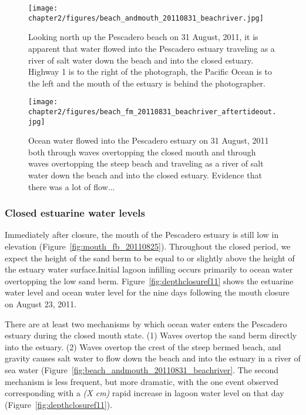 \begin{figure}
	\begin{center}
		\texttt{[image: chapter2/figures/beach\_andmouth\_20110831\_beachriver.jpg]} \caption{Looking north up the Pescadero beach on 31 August, 2011, it is apparent that water flowed into the Pescadero estuary traveling as a river of salt water down the beach and into the closed estuary. Highway 1 is to the right of the photograph, the Pacific Ocean is to the left and the mouth of the estuary is behind the photographer.}
	\end{center}
\label{fig:beachriver} \end{figure}

\begin{figure}
	\begin{center}
		\texttt{[image: chapter2/figures/beach\_fm\_20110831\_beachriver\_aftertideout.jpg]} \caption{Ocean water flowed into the Pescadero estuary on 31 August, 2011 both through waves overtopping the closed mouth and through waves overtopping the steep beach and traveling as a river of salt water down the beach and into the closed estuary. Evidence that there was a lot of flow...}
	\end{center}
\label{fig:beachriver_after} \end{figure}

\subsubsection{Closed estuarine water levels} \label{cl_wl}

Immediately after closure, the mouth of the Pescadero estuary is still low in elevation (Figure~\ref{fig:mouth_fb_20110825}). Throughout the closed period, we expect the height of the sand berm to be equal to or slightly above the height of the estuary water surface.Initial lagoon infilling occurs primarily to ocean water overtopping the low sand berm. Figure~\ref{fig:depthclosuref11} shows the estuarine water level and ocean water level for the nine days following the mouth closure on August 23, 2011.  

There are at least two mechanisms by which ocean water enters the Pescadero estuary during the closed mouth state. (1) Waves overtop the sand berm directly into the estuary. (2) Waves overtop the crest of the steep bermed beach, and gravity causes salt water to flow down the beach and into the estuary in a river of sea water (Figure~\ref{fig:beach_andmouth_20110831_beachriver}. The second mechanism is less frequent, but more dramatic, with the one event observed corresponding with a \emph{(X cm)} rapid increase in lagoon water level on that day (Figure~\ref{fig:depthclosuref11}).

